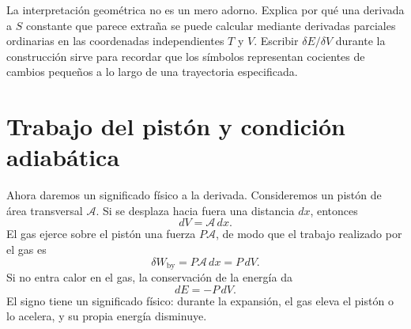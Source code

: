 La interpretación geométrica no es un mero adorno. Explica por qué una derivada a \(S\) constante que parece extraña se puede calcular mediante derivadas parciales ordinarias en las coordenadas independientes \(T\) y \(V\). Escribir \(\delta E/\delta V\) durante la construcción sirve para recordar que los símbolos representan cocientes de cambios pequeños a lo largo de una trayectoria especificada.

\begin{classroomqa}\end{classroomqa}

\begin{classroomqa}\end{classroomqa}

\section{Trabajo del pistón y condición adiabática}

Ahora daremos un significado físico a la derivada. Consideremos un pistón de área transversal \(\mathcal A\). Si se desplaza hacia fuera una distancia \(dx\), entonces \begin{equation}
 dV=\mathcal A\,dx.
 \label{eq:sm5-piston-volume}
\end{equation} El gas ejerce sobre el pistón una fuerza \(P\mathcal A\), de modo que el trabajo realizado por el gas es \begin{equation}
 \delta W_{\mathrm{by}}=P\mathcal A\,dx=P\,dV.
 \label{eq:sm5-piston-work}
\end{equation} Si no entra calor en el gas, la conservación de la energía da \begin{equation}
 dE=-P\,dV.
 \label{eq:sm5-adiabatic-work}
\end{equation} El signo tiene un significado físico: durante la expansión, el gas eleva el pistón o lo acelera, y su propia energía disminuye.

